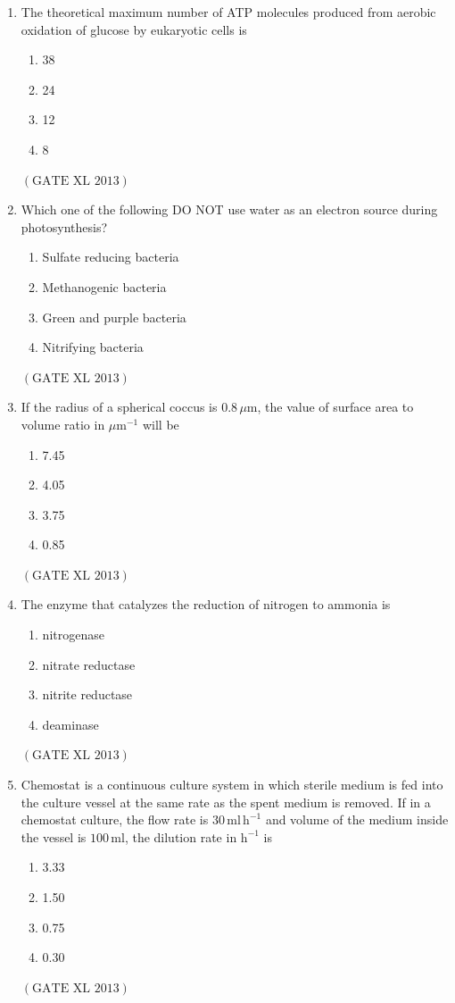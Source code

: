 \documentclass[12pt]{article}
\theoremstyle{remark}
\providecommand{\brak}[1]{\ensuremath{\left(#1\right)}}
\begin{document}
\begin{enumerate}
\item The theoretical maximum number of ATP molecules produced from aerobic oxidation of glucose by eukaryotic cells is
\begin{enumerate}
\item 38
\item 24
\item 12
\item 8
\end{enumerate}
\hfill $\brak{\text{GATE XL 2013}}$

\item Which one of the following DO NOT use water as an electron source during photosynthesis?
\begin{enumerate}
\item Sulfate reducing bacteria
\item Methanogenic bacteria
\item Green and purple bacteria
\item Nitrifying bacteria
\end{enumerate}
\hfill $\brak{\text{GATE XL 2013}}$

\item If the radius of a spherical coccus is $0.8\,\mu\text{m}$, the value of surface area to volume ratio in $\mu\text{m}^{-1}$ will be
\begin{enumerate}
\item 7.45
\item 4.05
\item 3.75
\item 0.85
\end{enumerate}
\hfill $\brak{\text{GATE XL 2013}}$

\item The enzyme that catalyzes the reduction of nitrogen to ammonia is
\begin{enumerate}
\item nitrogenase
\item nitrate reductase
\item nitrite reductase
\item deaminase
\end{enumerate}
\hfill $\brak{\text{GATE XL 2013}}$

\item Chemostat is a continuous culture system in which sterile medium is fed into the culture vessel at the same rate as the spent medium is removed. If in a chemostat culture, the flow rate is $30\,\text{ml}\,\text{h}^{-1}$ and volume of the medium inside the vessel is $100\,\text{ml}$, the dilution rate in $\text{h}^{-1}$ is
\begin{enumerate}
\item 3.33
\item 1.50
\item 0.75
\item 0.30
\end{enumerate}
\hfill $\brak{\text{GATE XL 2013}}$
\end{enumerate}
\end{document}
